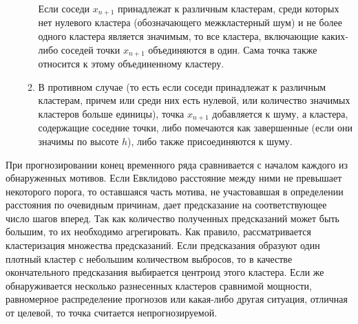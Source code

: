 \begin{enumerate}
\begin{enumerate}
        Если соседи $x_{n+1}$ принадлежат к различным кластерам, среди которых нет нулевого кластера (обозначающего межкластерный шум) и не более одного кластера является значимым, то все кластера, включающие каких-либо соседей точки $x_{n+1}$ объединяются в один. Сама точка также относится к этому объединенному кластеру.
    \item
        В противном случае (то есть если соседи принадлежат к различным кластерам, причем или среди них есть нулевой, или количество значимых кластеров больше единицы), точка $x_{n+1}$ добавляется к шуму, а кластера, содержащие соседние точки, либо помечаются как завершенные (если они значимы по высоте $h$), либо также присоединяются к шуму.
    \end{enumerate}
\end{enumerate}


При прогнозировании конец временного ряда сравнивается с началом каждого из обнаруженных мотивов.
Если Евклидово расстояние между ними не превышает некоторого порога, то оставшаяся часть мотива, не участовавшая в определении расстояния по очевидным причинам, дает предсказание на соответствующее число шагов вперед.
Так как количество полученных предсказаний может быть большим, то их необходимо агрегировать.
Как правило, рассматривается кластеризация множества предсказаний.
Если предсказания образуют один плотный кластер с небольшим количеством выбросов, то в качестве окончательного предсказания выбирается центроид этого кластера.
Если же обнаруживается несколько разнесенных кластеров сравнимой мощности, равномерное распределение прогнозов или какая-либо другая ситуация, отличная от целевой, то точка считается непрогнозируемой.

